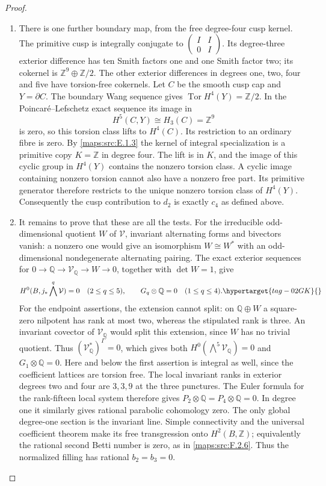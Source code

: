 \documentclass[11pt,a4paper]{article}
\numberwithin{equation}{section}
\theoremstyle{definition}
\begin{document}
\begin{proof}
\begin{enumerate}[label=\arabic*.]
\item There is one further boundary map, from the free
degree-four cusp kernel.
The primitive cusp is integrally conjugate to
$\left(\begin{smallmatrix}I&I\\0&I\end{smallmatrix}\right)$.
Its degree-three exterior difference has ten Smith
factors one and one Smith factor two; its cokernel is
$\mathbb Z^9\oplus\mathbb Z/2$.
The other exterior differences in degrees one, two,
four and five have torsion-free cokernels.
Let $C$ be the smooth cusp cap and $Y=\partial C$.
The boundary Wang sequence gives
$\operatorname{Tor}H^4(Y)=\mathbb Z/2$.
In the Poincar\'e--Lefschetz exact sequence its image in
\[
 H^5(C,Y)\cong H_3(C)=\mathbb Z^9
\]
is zero, so this torsion class lifts to $H^4(C)$.
Its restriction to an ordinary fibre is zero.
By \cref{maps:src:E.1.3} the kernel of integral specialization is
a primitive copy $K=\mathbb Z$ in degree four.
The lift is in $K$, and the image of this cyclic group
in $H^4(Y)$ contains the nonzero torsion class.
A cyclic image containing nonzero torsion cannot
also have a nonzero free part.
Its primitive generator therefore restricts to the
unique nonzero torsion class of $H^4(Y)$.
Consequently the cusp contribution to $d_2$ is exactly $c_4$
as defined above.

\item It remains to prove that these are all the tests.
For the irreducible odd-dimensional quotient $W$
of $\mathcal V$, invariant alternating forms and
bivectors vanish: a nonzero one would give an
isomorphism $W\cong W^*$ with an odd-dimensional
nondegenerate alternating pairing.
The exact exterior sequences for
$0\to\mathbb Q\to\mathcal V_{\mathbb Q}\to W\to0$,
together with $\det W=1$, give
\begin{equation}
 H^0(B,j_*\bigwedge^q\mathcal V)=0
       \quad(2\le q\le5),\qquad
 G_q\otimes\mathbb Q=0\quad(1\le q\le4).
 \hypertarget{tag-02GK}{}\label{maps:eq:F.HC8}
\end{equation}
For the endpoint assertions, the extension cannot split:
on $\mathbb Q\oplus W$ a square-zero nilpotent has rank at
most two, whereas the stipulated rank is three.
An invariant covector of $\mathcal V_{\mathbb Q}$ would
split this extension, since $W$ has no trivial quotient.
Thus $(\mathcal V_{\mathbb Q}^*)^\Gamma=0$, which gives
both $H^0(\bigwedge^5\mathcal V_{\mathbb Q})=0$ and
$G_1\otimes\mathbb Q=0$.
Here and below the first assertion is integral as well,
since the coefficient lattices are torsion free.
The local invariant ranks in exterior degrees two
and four are $3,3,9$ at the three punctures.
The Euler formula for the rank-fifteen local system
therefore gives $P_2\otimes\mathbb Q=P_4\otimes\mathbb Q=0$.
In degree one it similarly gives rational parabolic
cohomology zero.
The only global degree-one section is the invariant
line.  Simple connectivity and the universal
coefficient theorem make its free transgression
onto $H^2(B,\mathbb Z)$; equivalently the rational
second Betti number is zero, as in \ref{maps:src:F.2.6}.
Thus the normalized filling has rational $b_2=b_3=0$.


\end{enumerate}
\end{proof}
\end{document}
